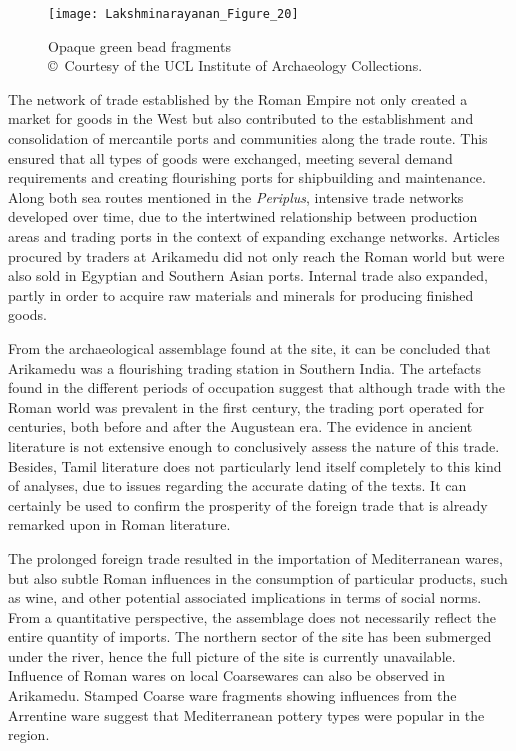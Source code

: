 \begin{figure}[!tb]
	\texttt{[image: Lakshminarayanan\_Figure\_20]}
	\caption{Opaque green bead fragments\\
		{\normalfont\scriptsize\copyright\ Courtesy of the UCL Institute of Archaeology Collections.
	}}
	\label{fig:Lakshminarayanan_Figure_20}
\end{figure}

The network of trade established by the Roman Empire not only created a market for goods in the West but also contributed to the establishment and consolidation of mercantile ports and communities along the trade route. This ensured that all types of goods were exchanged, meeting several demand requirements and creating flourishing ports for shipbuilding and maintenance. Along both sea routes mentioned in the \emph{Periplus}, intensive trade networks developed over time, due to the intertwined relationship between production areas and trading ports in the context of expanding exchange networks. Articles procured by traders at Arikamedu did not only reach the Roman world but were also sold in Egyptian and Southern Asian ports. Internal trade also expanded, partly in order to acquire raw materials and minerals for producing finished goods.


From the archaeological assemblage found at the site, it can be concluded that Arikamedu was a flourishing trading station in Southern India. The artefacts found in the different periods of occupation suggest that although trade with the Roman world was prevalent in the first century, the trading port operated for centuries, both before and after the Augustean era. The evidence in ancient literature is not extensive enough to conclusively assess the nature of this trade. Besides, Tamil literature does not particularly lend itself completely to this kind of analyses, due to issues regarding the accurate dating of the texts. It can certainly be used to confirm the prosperity of the foreign trade that is already remarked upon in Roman literature.

The prolonged foreign trade resulted in the importation of Mediterranean wares, but also subtle Roman influences in the consumption of particular products, such as wine, and other potential associated implications in terms of social norms. From a quantitative perspective, the assemblage does not necessarily reflect the entire quantity of imports. The northern sector of the site has been submerged under the river, hence the full picture of the site is currently unavailable. Influence of Roman wares on local Coarsewares can also be observed in Arikamedu. Stamped Coarse ware fragments showing influences from the Arrentine ware suggest that Mediterranean pottery types were popular in the region.

